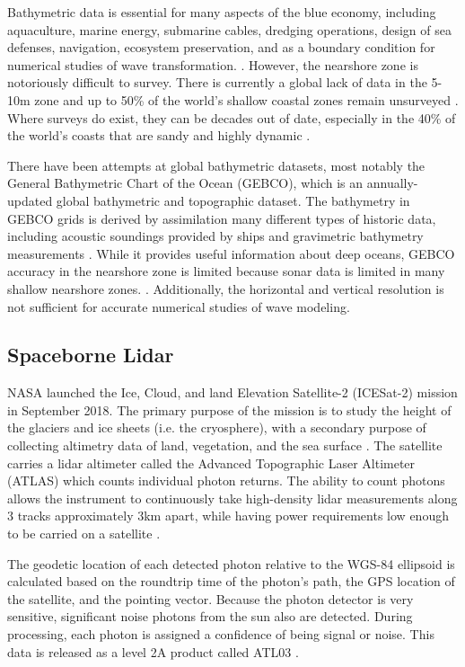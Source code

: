 Bathymetric data is essential for many aspects of the blue economy, including aquaculture, marine energy, submarine cables, dredging operations, design of sea defenses, navigation, ecosystem preservation, and as a boundary condition for numerical studies of wave transformation. \parencite{Cesbron2021,Ashphaq2021}. However, the nearshore zone is notoriously difficult to survey. There is currently a global lack of data in the 5-10m zone \parencite{Albright2021} and up to 50\% of the world's shallow coastal zones remain unsurveyed \parencite{IHO/OHI2022}. Where surveys do exist, they can be decades out of date, especially in the 40\% of the world's coasts that are sandy and highly dynamic \parencite{Almar2021e}.

There have been attempts at global bathymetric datasets, most notably the General Bathymetric Chart of the Ocean (GEBCO), which is an annually-updated global bathymetric and topographic dataset. The bathymetry in GEBCO grids is derived by assimilation many different types of historic data, including  acoustic soundings provided by ships and gravimetric bathymetry measurements \parencite{Cesbron2021}. While it provides useful information about deep oceans, GEBCO accuracy in the nearshore zone is limited because sonar data is limited in many shallow nearshore zones. \parencite{Monteys2015}. Additionally, the horizontal and vertical resolution is not sufficient for accurate numerical studies of wave modeling.

\subsection{Spaceborne Lidar}

NASA launched the Ice, Cloud, and land Elevation Satellite-2 (ICESat-2) mission in September 2018. The primary purpose of the mission is to study the height of the glaciers and ice sheets (i.e. the cryosphere), with a secondary purpose of collecting altimetry data of land, vegetation, and the sea surface \parencite{Markus2017}. The satellite carries a lidar altimeter called the Advanced Topographic Laser Altimeter (ATLAS) which counts individual photon returns. The ability to count photons allows the instrument to continuously take high-density lidar measurements along 3 tracks approximately 3km apart, while having power requirements low enough to be carried on a satellite \parencite{Popescu2018}. 

The geodetic location of each detected photon relative to the WGS-84 ellipsoid is calculated based on the roundtrip time of the photon's path, the GPS location of the satellite, and the pointing vector. Because the photon detector is very sensitive, significant noise photons from the sun also are detected. During processing, each photon is assigned a confidence of being signal or noise. This data is released as a level 2A product called ATL03 \parencite{Neumann2019d}.

